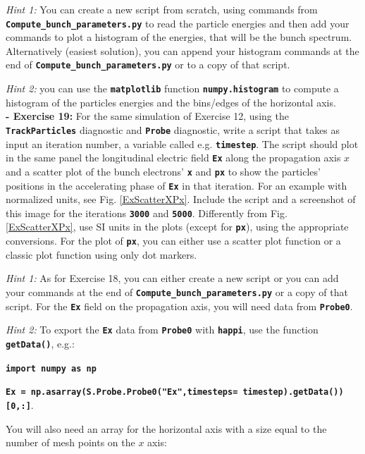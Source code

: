 \documentclass[a4paper,12pt]{extarticle}
\newcommand{\commandline}[1]{\texttt{\textbf{#1}}}
\begin{document}
\textit{Hint 1:} You can create a new script from scratch, using commands from \commandline{Compute\_bunch\_parameters.py} to read the particle energies and then add your commands to plot a histogram of the energies, that will be the bunch spectrum. Alternatively (easiest solution), you can append your histogram commands at the end of \commandline{Compute\_bunch\_parameters.py} or to a copy of that script.

\textit{Hint 2:} you can use the \commandline{matplotlib} function \commandline{numpy.histogram} to compute a histogram of the particles energies and the bins/edges of the horizontal axis.\\

\textbf{- Exercise 19:} For the same simulation of Exercise 12, using the \commandline{TrackParticles} diagnostic and \commandline{Probe} diagnostic, write a script that takes as input an iteration number, a variable called e.g. \commandline{timestep}. The script should plot in the same panel the longitudinal electric field \commandline{Ex} along the propagation axis $x$ and a scatter plot of the bunch electrons' \commandline{x} and \commandline{px} to show the particles' positions in the accelerating phase of \commandline{Ex} in that iteration. For an example with normalized units, see Fig. \ref{ExScatterXPx}. Include the script and a screenshot of this image for the iterations \commandline{3000} and \commandline{5000}.  Differently from Fig.  \ref{ExScatterXPx}, use SI units in the plots (except for \commandline{px}), using the appropriate conversions. For the plot of \commandline{px}, you can either use a scatter plot function or a classic plot function using only dot markers.

\textit{Hint 1:} As for Exercise 18, you can either create a new script or you can add your commands at the end of \commandline{Compute\_bunch\_parameters.py} or a copy of that script. For the \commandline{Ex} field on the propagation axis, you will need data from \commandline{Probe0}. 

\textit{Hint 2:} To export the \commandline{Ex} data from \commandline{Probe0} with \commandline{happi}, use the function \commandline{getData()}, e.g.:

\commandline{import numpy as np}

\commandline{Ex = np.asarray(S.Probe.Probe0("Ex",timesteps= timestep).getData())[0,:]}.

You will also need an array for the horizontal axis with a size equal to the number of mesh points on the $x$ axis: 
\end{document}

